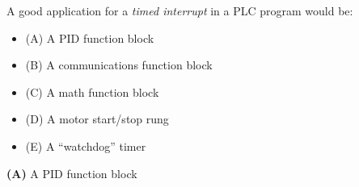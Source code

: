 

A good application for a {\it timed interrupt} in a PLC program would be:

\begin{itemize}
\item{(A)} A PID function block
\vskip 5pt 
\item{(B)} A communications function block
\vskip 5pt 
\item{(C)} A math function block
\vskip 5pt 
\item{(D)} A motor start/stop rung
\vskip 5pt 
\item{(E)} A ``watchdog'' timer
\end{itemize}







{\bf (A)} A PID function block
 










